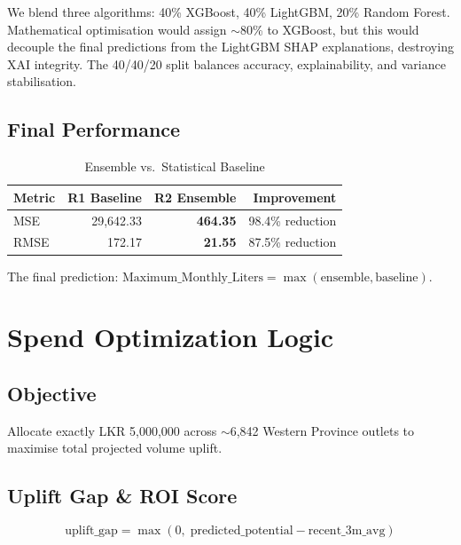 \documentclass[10.75pt, a4paper]{article}
\begin{document}
We blend three algorithms: 40\% XGBoost, 40\% LightGBM, 20\% Random Forest. Mathematical optimisation would assign $\sim$80\% to XGBoost, but this would decouple the final predictions from the LightGBM SHAP explanations, destroying XAI integrity. The 40/40/20 split balances accuracy, explainability, and variance stabilisation.

\subsection{Final Performance}

\begin{table}[H]
\centering
\caption{Ensemble vs.\ Statistical Baseline}
\begin{tabular}{lrrr}
\toprule
\textbf{Metric} & \textbf{R1 Baseline} & \textbf{R2 Ensemble} & \textbf{Improvement} \\
\midrule
MSE & 29,642.33 & \textbf{464.35} & 98.4\% reduction \\
RMSE & 172.17 & \textbf{21.55} & 87.5\% reduction \\
\bottomrule
\end{tabular}
\end{table}

The final prediction: $\text{Maximum\_Monthly\_Liters} = \max(\text{ensemble}, \text{baseline})$.

\section{Spend Optimization Logic}

\subsection{Objective}

Allocate exactly LKR 5,000,000 across $\sim$6,842 Western Province outlets to maximise total projected volume uplift.

\subsection{Uplift Gap \& ROI Score}

\begin{equation}
\text{uplift\_gap} = \max(0,\; \text{predicted\_potential} - \text{recent\_3m\_avg})
\end{equation}
\end{document}
